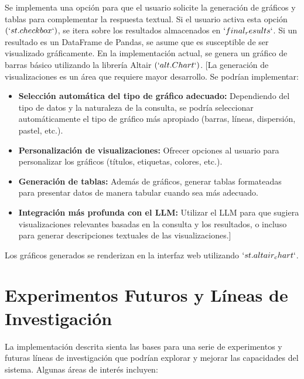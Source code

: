 Se implementa una opción para que el usuario solicite la generación de gráficos y tablas para complementar la respuesta textual.  Si el usuario activa esta opción $(`st.checkbox`)$,  se itera sobre los resultados almacenados en $`final_results`$.  Si un resultado es un DataFrame de Pandas,  se asume que es susceptible de ser visualizado gráficamente.  En la implementación actual,  se genera un gráfico de barras básico utilizando la librería Altair $(`alt.Chart`)$.  [La generación de visualizaciones es un área que requiere mayor desarrollo.  Se podrían implementar:
\begin{itemize}
	\item \textbf{Selección automática del tipo de gráfico adecuado:}  Dependiendo del tipo de datos y la naturaleza de la consulta,  se podría seleccionar automáticamente el tipo de gráfico más apropiado (barras, líneas, dispersión, pastel, etc.).
	\item \textbf{Personalización de visualizaciones:}  Ofrecer opciones al usuario para personalizar los gráficos (títulos, etiquetas, colores, etc.).
	\item \textbf{Generación de tablas:}  Además de gráficos,  generar tablas formateadas para presentar datos de manera tabular cuando sea más adecuado.
	\item \textbf{Integración más profunda con el LLM:}  Utilizar el LLM para que sugiera visualizaciones relevantes basadas en la consulta y los resultados,  o incluso para generar descripciones textuales de las visualizaciones.]
\end{itemize}
Los gráficos generados se renderizan en la interfaz web utilizando $`st.altair_chart`$.


\section{Experimentos Futuros y Líneas de Investigación}

La implementación descrita sienta las bases para una serie de experimentos y futuras líneas de investigación que podrían explorar y mejorar las capacidades del sistema.  Algunas áreas de interés incluyen:


